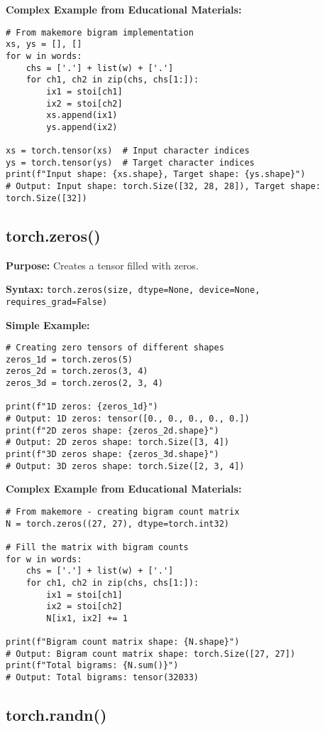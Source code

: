 \documentclass[11pt,a4paper]{book}
\begin{document}
\textbf{Complex Example from Educational Materials:}
\begin{verbatim}
# From makemore bigram implementation
xs, ys = [], []
for w in words:
    chs = ['.'] + list(w) + ['.']
    for ch1, ch2 in zip(chs, chs[1:]):
        ix1 = stoi[ch1]
        ix2 = stoi[ch2]
        xs.append(ix1)
        ys.append(ix2)
        
xs = torch.tensor(xs)  # Input character indices
ys = torch.tensor(ys)  # Target character indices
print(f"Input shape: {xs.shape}, Target shape: {ys.shape}")
# Output: Input shape: torch.Size([32, 28, 28]), Target shape: torch.Size([32])
\end{verbatim}

\subsection{torch.zeros()}

\textbf{Purpose:} Creates a tensor filled with zeros.

\textbf{Syntax:} \texttt{torch.zeros(size, dtype=None, device=None, requires\_grad=False)}

\textbf{Simple Example:}
\begin{verbatim}
# Creating zero tensors of different shapes
zeros_1d = torch.zeros(5)
zeros_2d = torch.zeros(3, 4)
zeros_3d = torch.zeros(2, 3, 4)

print(f"1D zeros: {zeros_1d}")
# Output: 1D zeros: tensor([0., 0., 0., 0., 0.])
print(f"2D zeros shape: {zeros_2d.shape}")
# Output: 2D zeros shape: torch.Size([3, 4])
print(f"3D zeros shape: {zeros_3d.shape}")
# Output: 3D zeros shape: torch.Size([2, 3, 4])
\end{verbatim}

\textbf{Complex Example from Educational Materials:}
\begin{verbatim}
# From makemore - creating bigram count matrix
N = torch.zeros((27, 27), dtype=torch.int32)

# Fill the matrix with bigram counts
for w in words:
    chs = ['.'] + list(w) + ['.']
    for ch1, ch2 in zip(chs, chs[1:]):
        ix1 = stoi[ch1]
        ix2 = stoi[ch2]
        N[ix1, ix2] += 1

print(f"Bigram count matrix shape: {N.shape}")
# Output: Bigram count matrix shape: torch.Size([27, 27])
print(f"Total bigrams: {N.sum()}")
# Output: Total bigrams: tensor(32033)
\end{verbatim}

\subsection{torch.randn()}
\end{document}
